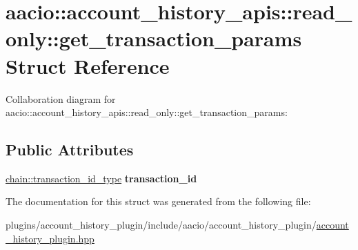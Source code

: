 \hypertarget{structaacio_1_1account__history__apis_1_1read__only_1_1get__transaction__params}{}\section{aacio\+:\+:account\+\_\+history\+\_\+apis\+:\+:read\+\_\+only\+:\+:get\+\_\+transaction\+\_\+params Struct Reference}
\label{structaacio_1_1account__history__apis_1_1read__only_1_1get__transaction__params}


Collaboration diagram for aacio\+:\+:account\+\_\+history\+\_\+apis\+:\+:read\+\_\+only\+:\+:get\+\_\+transaction\+\_\+params\+:
\subsection*{Public Attributes}
\begin{DoxyCompactItemize}
\item 
\mbox{\label{structaacio_1_1account__history__apis_1_1read__only_1_1get__transaction__params_af22ae7828d9d4c28e9ca0c8f487e8ea8}} 
\mbox{\hyperlink{classfc_1_1sha256}{chain\+::transaction\+\_\+id\+\_\+type}} {\bfseries transaction\+\_\+id}
\end{DoxyCompactItemize}


The documentation for this struct was generated from the following file\+:\begin{DoxyCompactItemize}
\item 
plugins/account\+\_\+history\+\_\+plugin/include/aacio/account\+\_\+history\+\_\+plugin/\mbox{\hyperlink{account__history__plugin_8hpp}{account\+\_\+history\+\_\+plugin.\+hpp}}\end{DoxyCompactItemize}
